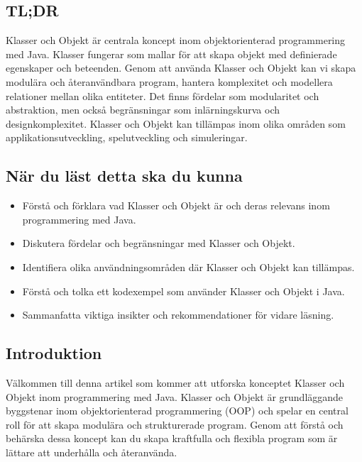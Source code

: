 \hypertarget{tldr}{%
\subsection{TL;DR}\label{tldr}}

Klasser och Objekt är centrala koncept inom objektorienterad
programmering med Java. Klasser fungerar som mallar för att skapa objekt
med definierade egenskaper och beteenden. Genom att använda Klasser och
Objekt kan vi skapa modulära och återanvändbara program, hantera
komplexitet och modellera relationer mellan olika entiteter. Det finns
fördelar som modularitet och abstraktion, men också begränsningar som
inlärningskurva och designkomplexitet. Klasser och Objekt kan tillämpas
inom olika områden som applikationsutveckling, spelutveckling och
simuleringar.

\hypertarget{nuxe4r-du-luxe4st-detta-ska-du-kunna}{%
\subsection{När du läst detta ska du
kunna}\label{nuxe4r-du-luxe4st-detta-ska-du-kunna}}

\begin{itemize}
\tightlist
\item
  Förstå och förklara vad Klasser och Objekt är och deras relevans inom
  programmering med Java.
\item
  Diskutera fördelar och begränsningar med Klasser och Objekt.
\item
  Identifiera olika användningsområden där Klasser och Objekt kan
  tillämpas.
\item
  Förstå och tolka ett kodexempel som använder Klasser och Objekt i
  Java.
\item
  Sammanfatta viktiga insikter och rekommendationer för vidare läsning.
\end{itemize}

\hypertarget{introduktion}{%
\subsection{Introduktion}\label{introduktion}}

Välkommen till denna artikel som kommer att utforska konceptet Klasser
och Objekt inom programmering med Java. Klasser och Objekt är
grundläggande byggstenar inom objektorienterad programmering (OOP) och
spelar en central roll för att skapa modulära och strukturerade program.
Genom att förstå och behärska dessa koncept kan du skapa kraftfulla och
flexibla program som är lättare att underhålla och återanvända.

